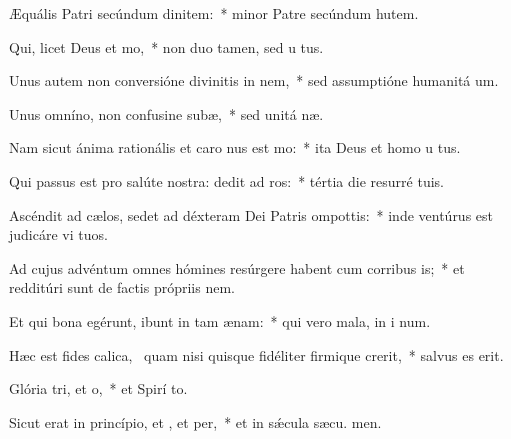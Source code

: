 \item Æquális Patri secúndum dinitem:~* minor Patre secúndum hutem.
\item Qui, licet Deus  et mo,~* non duo tamen, sed u  tus.
\item Unus autem non conversióne divinitis in nem,~* sed assumptióne humanitá  um.
\item Unus omníno, non confusine subæ,~* sed unitá næ.
\item Nam sicut ánima rationális et caro nus est mo:~* ita Deus et homo u  tus.
\item Qui passus est pro salúte nostra: dedit ad ros:~* tértia die resurré  tuis.
\item Ascéndit ad cælos, sedet ad déxteram Dei Patris ompottis:~* inde ventúrus est judicáre vi  tuos.
\item Ad cujus advéntum omnes hómines resúrgere habent cum corribus is;~* et redditúri sunt de factis própriis nem.
\item Et qui bona egérunt, ibunt in tam ænam:~* qui vero mala, in i num.
\item Hæc est fides calica,~\pscross{} quam nisi quisque fidéliter firmique crerit,~* salvus es  erit.
\item Glória tri, et o,~* et Spirí to.
\item Sicut erat in princípio, et , et per,~* et in sǽcula sæcu. men.
